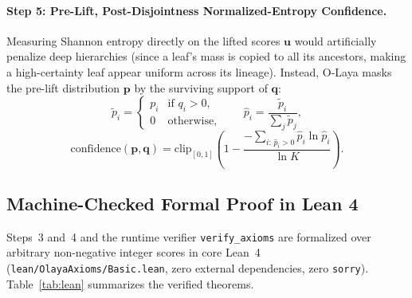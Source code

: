 \documentclass[11pt,a4paper]{article}
\begin{document}
\paragraph{Step 5: Pre-Lift, Post-Disjointness Normalized-Entropy Confidence.}
Measuring Shannon entropy directly on the lifted scores $\mathbf{u}$ would artificially penalize deep hierarchies (since a leaf's mass is copied to all its ancestors, making a high-certainty leaf appear uniform across its lineage). Instead, O-Laya masks the pre-lift distribution $\mathbf{p}$ by the surviving support of $\mathbf{q}$:
\begin{equation}
  \tilde{p}_i = \begin{cases} p_i & \text{if } q_i > 0, \\ 0 & \text{otherwise}, \end{cases}
  \qquad
  \hat{p}_i = \frac{\tilde{p}_i}{\sum_j \tilde{p}_j},
\end{equation}
\begin{equation}
  \mathrm{confidence}(\mathbf{p}, \mathbf{q}) = \mathrm{clip}_{[0,1]}\!\left(1 - \frac{-\sum_{i:\, \hat{p}_i > 0} \hat{p}_i \ln \hat{p}_i}{\ln K}\right).
\end{equation}

\subsection{Machine-Checked Formal Proof in Lean 4}

Steps~3 and~4 and the runtime verifier \texttt{verify\_axioms} are formalized over arbitrary non-negative integer scores in core Lean~4 (\texttt{lean/OlayaAxioms/Basic.lean}, zero external dependencies, zero \texttt{sorry}). Table~\ref{tab:lean} summarizes the verified theorems.
\end{document}
